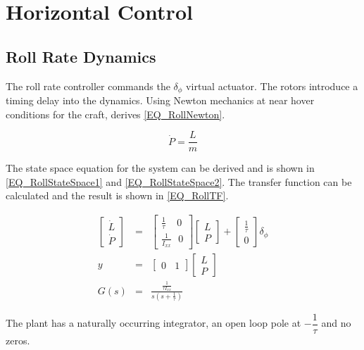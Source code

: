 	 \section{Horizontal Control}
	 
	 \subsection{Roll Rate Dynamics}
	 The roll rate controller commands the $\delta_\phi$ virtual actuator. The rotors introduce a timing delay into the dynamics. Using Newton mechanics at near hover conditions for the craft, derives \eqref{EQ_RollNewton}. 
	 
	 \begin{equation}
	 \label{EQ_RollNewton}
	 \dot{P} = \dfrac{L}{m}
	 \end{equation}
	 
	 The state space equation for the system can be derived and is shown in \eqref{EQ_RollStateSpace1} and \eqref{EQ_RollStateSpace2}. The transfer function can be calculated and the result is shown in \eqref{EQ_RollTF}.
	 
	 \begin{eqnarray}
	 \begin{bmatrix} \dot{L} \\ \dot{P}	\end{bmatrix}&=&\begin{bmatrix}\frac{1}{\tau}\ \ \ \ \ 0\\\frac{1}{I_{xx}} \ \ \ 0 \end{bmatrix} \begin{bmatrix} L \\ P \end{bmatrix} + \begin{bmatrix}\frac{1}{\tau}\\ 0 \end{bmatrix} \delta_\phi\\ \label{EQ_RollStateSpace1}
	 y &=& \begin{bmatrix} 0 \ \ \ \ 1 \end{bmatrix} \begin{bmatrix} L \\ P \end{bmatrix} \label{EQ_RollStateSpace2}\\
	 G(s) &=& \frac{\frac{1}{\tau I_{xx}}}{s (s + \frac{1}{\tau})}\label{EQ_RollTF}
	 \end{eqnarray}
	 
	 The plant has a naturally occurring integrator, an open loop pole at $-\dfrac{1}{\tau}$ and no zeros.
	 
